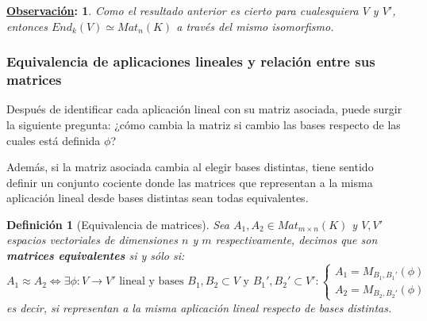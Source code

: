 \documentclass[10pt,a4paper,openright]{book}
\theoremstyle{break}
\newtheorem*{defi}{Definición}
\newtheorem*{obs}{\underline{Observación}:}
\begin{document}
\begin{obs}
Como el resultado anterior es cierto para cualesquiera $V$ y $V'$, entonces $End_k(V)\simeq Mat_n(K)$ a través del mismo isomorfismo.
\end{obs}

\subsubsection{Equivalencia de aplicaciones lineales y relación entre sus matrices}
Después de identificar cada aplicación lineal con su matriz asociada, puede surgir la siguiente pregunta: ¿cómo cambia la matriz si cambio las bases respecto de las cuales está definida $\phi$?

Además, si la matriz asociada cambia al elegir bases distintas, tiene sentido definir un conjunto cociente donde las matrices que representan a la misma aplicación lineal desde bases distintas sean todas equivalentes.

\begin{defi}[Equivalencia de matrices]
Sea $A_1, A_2\in Mat_{m\times n}(K)$ y $V, V'$ espacios vectoriales de dimensiones $n$ y $m$ respectivamente, decimos que son \textbf{matrices equivalentes} si y sólo si:
$$A_1\approx A_2 \Leftrightarrow \exists \phi: V\rightarrow V'\mbox{ lineal y bases } B_1,B_2\subset V \mbox{ y } B_1', B_2'\subset V': \begin{cases}
A_1=M_{B_1,B_1'}(\phi) \\ A_2=M_{B_2,B_2'}(\phi)
\end{cases}$$
es decir, si representan a la misma aplicación lineal respecto de bases distintas.
\end{defi}
\end{document}

